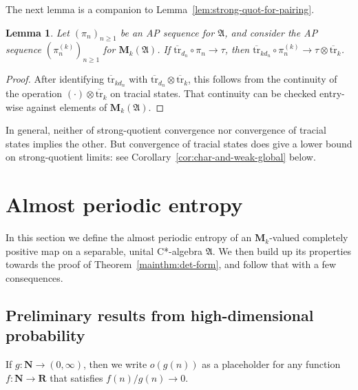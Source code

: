 \documentclass[12pt,a4paper]{article}
\numberwithin{equation}{section}
\newtheorem{lem}[thm]{Lemma}
\theoremstyle{remark}
\newcommand{\bbN}{\mathbf{N}}
\newcommand{\bbR}{\mathbf{R}}
\newcommand{\rmM}{\mathbf{M}}
\newcommand{\A}{\mathfrak{A}}
\newcommand{\tr}{\overline{\mathrm{tr}}}
\begin{document}
The next lemma is a companion to Lemma~\ref{lem:strong-quot-for-pairing}.

\begin{lem}\label{lem:trace-conv-for-pairing}
Let $(\pi_n)_{n\ge 1}$ be an AP sequence for $\A$, and consider the AP sequence $(\pi^{(k)}_n)_{n\ge 1}$ for $\rmM_k(\A)$.  If $\tr_{d_n}\circ \pi_n\to \tau$, then $\tr_{kd_n}\circ \pi_n^{(k)}\to \tau \otimes \tr_k$.
\end{lem}

\begin{proof}
After identifying $\tr_{kd_n}$ with $\tr_{d_n}\otimes \tr_k$, this follows from the continuity of the operation $(\cdot)\otimes \tr_k$ on tracial states.  That continuity can be checked entry-wise against elements of $\rmM_k(\A)$.
\end{proof}

In general, neither of strong-quotient convergence nor convergence of tracial states implies the other.  But convergence of tracial states does give a lower bound on strong-quotient limits: see Corollary~\ref{cor:char-and-weak-global} below.


























\section{Almost periodic entropy}\label{sec:AP}

In this section we define the almost periodic entropy of an $\rmM_k$-valued completely positive map on a separable, unital C*-algebra $\A$.  We then build up its properties towards the proof of Theorem~\ref{mainthm:det-form}, and follow that with a few consequences.



\subsection{Preliminary results from high-dimensional probability}

If $g:\bbN \to (0,\infty)$, then we write $o(g(n))$ as a placeholder for any function $f:\bbN\to \bbR$ that satisfies $f(n)/g(n) \to 0$.
\end{document}

